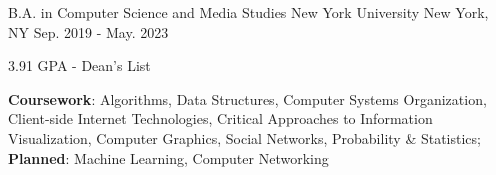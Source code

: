 

\begin{cventries}
  \cventry
    {B.A. in Computer Science and Media Studies} %
    {New York University} %
    {New York, NY} %
    {Sep. 2019 - May. 2023} %
    {
      \begin{cvitems} %
        \item {3.91 GPA - Dean's List}
        \item {\textbf{Coursework}: Algorithms, Data Structures, Computer Systems Organization, Client-side Internet Technologies, Critical Approaches to Information Visualization, Computer Graphics, Social Networks, Probability \& Statistics; \textbf{Planned}: Machine Learning, Computer Networking}
      \end{cvitems}
    }
\end{cventries}
